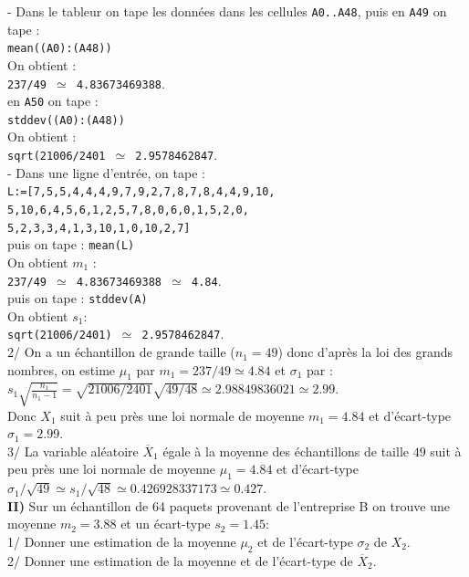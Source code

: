\documentclass[a4paper,11pt]{book}
\begin{document}
\begin{itemize}
- Dans le tableur on tape les donn\'ees dans les cellules {\tt A0..A48}, puis 
en {\tt A49} on tape  :\\
{\tt mean((A0):(A48))}\\
On obtient :\\
{\tt 237/49 $\simeq$ 4.83673469388}.\\
en {\tt A50} on tape  :\\
{\tt stddev((A0):(A48))}\\
On obtient :\\
{\tt sqrt(21006/2401 $\simeq$ 2.9578462847}.\\
- Dans une ligne d'entr\'ee, on tape :\\
{\tt L:=[7,5,5,4,4,4,9,7,9,2,7,8,7,8,4,4,9,10,\\
5,10,6,4,5,6,1,2,5,7,8,0,6,0,1,5,2,0,\\
5,2,3,3,4,1,3,10,1,0,10,2,7]}\\
puis  on tape :
{\tt mean(L)}\\
On obtient $m_1$ :\\
{\tt 237/49 $\simeq$ 4.83673469388 $\simeq$ 4.84}.\\
puis  on tape : {\tt stddev(A)}\\
On obtient $s_1$:\\
{\tt sqrt(21006/2401) $\simeq$ 2.9578462847}.\\
2/ On a un \'echantillon de grande taille ($n_1=49$) donc d'apr\`es la loi des 
grands nombres, on  estime $\mu_1$ par $m_1= 237/49 \simeq 4.84$ et $\sigma_1$ 
par :\\
$s_1\sqrt{\frac{n_1}{n_1-1}}=\sqrt{21006/2401}\sqrt{49/48}\simeq 2.98849836021\simeq 2.99$. \\
Donc $X_1$ suit \`a peu pr\`es une loi 
normale  de moyenne $m_1=4.84$ et d'\'ecart-type 
$\sigma_1=2.99$. \\
3/ La variable al\'eatoire $\overline X_1$ \'egale \`a la
 moyenne des \'echantillons de taille $49$ suit \`a peu pr\`es une loi 
normale de moyenne $\mu_1=4.84$ et d'\'ecart-type 
$\sigma_1/\sqrt{49} \simeq s_1/\sqrt{48}\simeq 0.426928337173\simeq 0.427$.\\
 {\bf II)} Sur un \'echantillon de 64 paquets provenant de l'entreprise B on 
trouve une moyenne $m_2=3.88$ et un \'ecart-type $s_2=1.45$:\\
1/ Donner une estimation de la moyenne $\mu_2$ et de l'\'ecart-type $\sigma_2$
de $X_2$.\\
2/ Donner une estimation de la moyenne et de l'\'ecart-type de $\overline X_2$.\\

\end{itemize}
\end{document}
